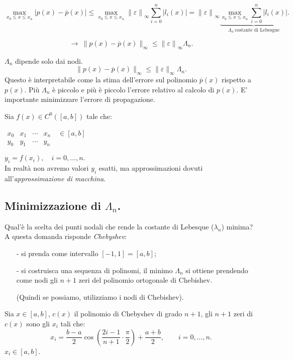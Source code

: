 \[\max_{x_0 \leq x \leq x_n}|p(x) - \overline{p}(x)| \leq \max_{x_0 \leq x \leq x_n}
\left\|\varepsilon\right\|_{\infty}\sum_{i=0}^n\left|l_i(x)\right|
= \left\|\varepsilon\right\|_{\infty}
\underbrace{\max_{x_0 \leq x \leq x_n}\sum_{i=0}^n\left|l_i(x)\right|}_{\Lambda_n \
\textrm{costante di Lebesgue}}.
\]

\[\longrightarrow\ \|p(x) - \overline{p}(x) \|_{\infty} \leq  \left\|
\varepsilon\right\|_{\infty}\Lambda_n.\]

\begin{osse}
$\Lambda_n$ dipende solo dai nodi.
\[
\|p(x) -\overline{p}(x)\|_{\infty} \leq \|\varepsilon\|_{\infty}\Lambda_n.
\]
Questo è interpretabile come la stima dell'errore sul polinomio 
$\overline{p}(x)$ rispetto a $p(x)$. Più $\Lambda_n$ è piccolo e più è
piccolo l'errore relativo al calcolo di $p(x)$. E' importante minimizzare
l'errore di propagazione.
\end{osse}

Sia $f(x) \in C^0([a,b])$ tale che:
\begin{flushleft}$\begin{array}{ccccc}
x_0 & x_1 & \cdots & x_n  \quad \in [a,b] \\
y_0 & y_1 & \cdots & y_n  
\end{array}$\end{flushleft}
$y_i = f(x_i), \quad i=0,\ldots,n.$\\

In realtà non avremo valori $y_i$ esatti, ma approssimazioni dovuti 
all'\emph{approssimazione di macchina}.

\subsection{Minimizzazione di $\Lambda_n$.}
Qual'è la scelta dei punti nodali che rende la costante di Lebesque 
($\lambda_n$) minima? A questa domanda risponde \emph{Chebyshev}:
\begin{itemize}
\item[-] si prenda come intervallo $[-1,1] = [a,b]$;
\item[-] si costruisca una sequenza di polinomi, il minimo $\Lambda_n$ si
ottiene prendendo come nodi gli $n+1$ zeri del polinomio ortogonale di 
Chebishev.
\item[] (Quindi se possiamo, utilizziamo i nodi di Chebishev).
\end{itemize}

\begin{defi}Sia $x \in [a,b]$, $c(x)$ il polinomio di Chebyshev di grado 
$n+1$, gli $n+1$
zeri di $c(x)$ sono gli $x_i$ tali che:
\[
x_i = \frac{b -a}{2}\cos \left( \frac{2i-1}{n+1}  \cdot \frac{\pi}{2}\right) +
\frac{a+b}{2}, \qquad i = 0, \ldots, n.
\]
$x_i \in [a,b]$.
\end{defi}


